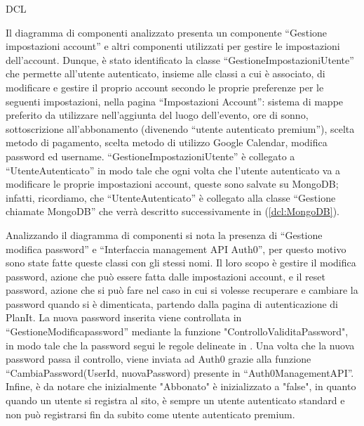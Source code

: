 \begin{listaPersonale}{DCL}

    Il diagramma di componenti analizzato presenta un componente “Gestione impostazioni account” e altri componenti utilizzati per gestire le impostazioni dell'account. Dunque, è stato identificato la classe “GestioneImpostazioniUtente” che permette all'utente autenticato, insieme alle classi a cui è associato, di modificare e gestire il proprio account secondo le proprie preferenze per le seguenti impostazioni, nella pagina “Impostazioni Account”: sistema di mappe preferito da utilizzare nell'aggiunta del luogo dell'evento, ore di sonno, sottoscrizione all'abbonamento (divenendo “utente autenticato premium”), scelta metodo di pagamento, scelta metodo di utilizzo Google Calendar, modifica password ed username.
    “GestioneImpostazioniUtente” è collegato a “UtenteAutenticato” in modo tale che ogni volta che l'utente autenticato va a modificare le proprie impostazioni account, queste sono salvate su MongoDB; infatti, ricordiamo, che “UtenteAutenticato” è collegato alla classe “Gestione chiamate MongoDB” che verrà descritto successivamente in (\ref{dcl:MongoDB}).


    \begin{center}
        
    \end{center}
    \newpage


    \begin{listaPersonale2}[DCL]{}

        Analizzando il diagramma di componenti si nota la presenza di “Gestione modifica password” e “Interfaccia management API Auth0”, per questo motivo sono state fatte queste classi con gli stessi nomi. Il loro scopo è gestire il modifica password, azione che può essere fatta dalle impostazioni account, e il reset password, azione che si può fare nel caso in cui si volesse recuperare e cambiare la password quando si è dimenticata, partendo dalla pagina di autenticazione di PlanIt. La nuova password inserita viene controllata in “GestioneModificapassword” mediante la funzione "ControlloValiditaPassword", in modo tale che la password segui le regole delineate in . Una volta che la nuova password passa il controllo, viene inviata ad Auth0 grazie alla funzione “CambiaPassword(UserId, nuovaPassword) presente in “Auth0ManagementAPI”.
        Infine, è da notare che inizialmente "Abbonato" è inizializzato a "false", in quanto quando un utente si registra al sito, è sempre un utente autenticato standard e non può registrarsi fin da subito come utente autenticato premium.



\end{listaPersonale2}
\end{listaPersonale}
